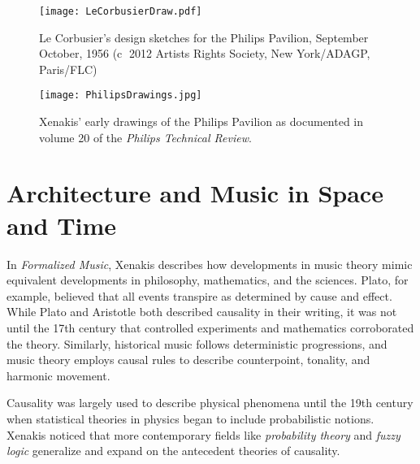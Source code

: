 \begin{figure*}[]
  \texttt{[image: LeCorbusierDraw.pdf]}
  \caption{Le Corbusier's design sketches for the Philips Pavilion,
    September \textendash{} October, 1956 (\textcircled{c} 2012
    Artists Rights Society, New York/ADAGP, Paris/FLC)}
  \label{fig:le-corbusier-sketch}
\end{figure*}

\begin{figure*}[h]
  \texttt{[image: PhilipsDrawings.jpg]}
  \caption{Xenakis' early drawings of the Philips Pavilion as
    documented in volume 20 of the \textit{Philips Technical Review}.}
  \label{fig:xenakis-draw}
\end{figure*}

\section{Architecture and Music in Space and Time}
\label{sec:introduction-conclusion}

In \textit{Formalized Music},\cite{xenakis1992formalized} Xenakis
describes how developments in music theory mimic equivalent
developments in philosophy, mathematics, and the sciences. Plato, for
example, believed that all events transpire as determined by cause and
effect. While Plato and Aristotle both described causality in their
writing, it was not until the 17th century that controlled experiments
and mathematics corroborated the theory.
Similarly, historical music follows deterministic progressions, and
music theory employs causal rules to describe counterpoint, tonality,
and harmonic movement.

Causality was largely used to describe physical phenomena until the
19th century when statistical theories in physics began to include
probabilistic notions. Xenakis
noticed that more contemporary fields like \emph{probability theory}
and \emph{fuzzy logic} generalize and expand on the antecedent
theories of causality.

